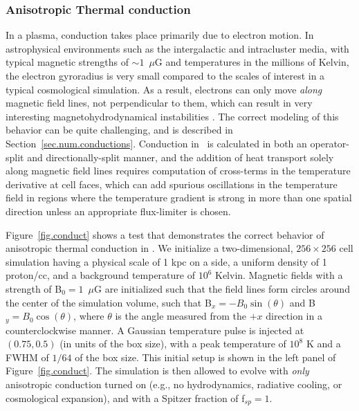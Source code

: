 \subsubsection{Anisotropic Thermal conduction}
\label{sec.tests.conduct}

In a plasma, conduction takes place primarily due to electron motion.
In astrophysical environments such as the intergalactic and
intracluster media, with typical magnetic strengths of $\sim 1$~$\mu$G
and temperatures in the millions of Kelvin, the electron gyroradius is
very small compared to the scales of interest in a typical
cosmological simulation.  As a result, electrons can only move
\textit{along} magnetic field lines, not perpendicular to them, which
can result in very interesting magnetohydrodynamical instabilities
\citep[e.g.,][]{2008ApJ...677L...9P,2008ApJ...688..905P}.  The correct
modeling of this behavior can be quite challenging, and is described
in Section~\ref{sec.num.conductions}.  Conduction in \enzo\ is
calculated in both an operator-split and directionally-split manner,
and the addition of heat transport solely along magnetic field lines
requires computation of cross-terms in the temperature derivative at
cell faces, which can add spurious oscillations in the temperature
field in regions where the temperature gradient is strong in more than
one spatial direction unless an appropriate flux-limiter \citep[such
as that of][]{1977JCoPh..23..263V} is chosen.

Figure~\ref{fig.conduct} shows a test that demonstrates the correct
behavior of anisotropic thermal conduction in \enzo.  We initialize a
two-dimensional, $256 \times 256$ cell simulation having a physical
scale of 1 kpc on a side, a uniform density of 1 proton/cc, and a
background temperature of $10^6$ Kelvin.  Magnetic fields with a
strength of B$_0 = 1$~$\mu$G are initialized such that the field lines
form circles around the center of the simulation volume, such that
B$_x = -B_0\sin(\theta)$ and B$_y = B_0\cos(\theta)$, where $\theta$
is the angle measured from the $+x$ direction in a counterclockwise
manner.  A Gaussian temperature pulse is injected at $(0.75, 0.5)$ (in
units of the box size), with a peak temperature of $10^8$ K and a FWHM
of $1/64$ of the box size.  This initial setup is shown in the left
panel of Figure~\ref{fig.conduct}.  The simulation is then allowed to
evolve with \textit{only} anisotropic conduction turned on (e.g., no
hydrodynamics, radiative cooling, or cosmological expansion), and with
a Spitzer fraction of f$_{sp} = 1$.

